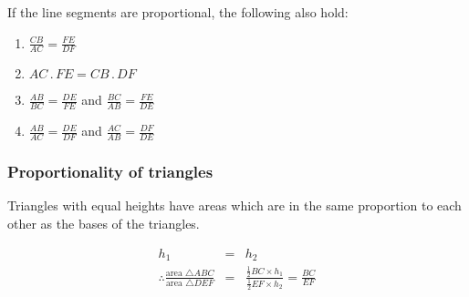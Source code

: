 If the line segments are proportional, the following also hold:
\begin{enumerate}
\item $\frac{CB}{AC} = \frac{FE}{DF}$
\item $AC\,.\, FE = CB\,.\, DF$
\item $\frac{AB}{BC} = \frac{DE}{FE}$ and $\frac{BC}{AB} = \frac{FE}{DE}$
\item $\frac{AB}{AC} = \frac{DE}{DF}$ and $\frac{AC}{AB} = \frac{DF}{DE}$
\end{enumerate}

\subsubsection*{Proportionality of triangles}
Triangles with equal heights have areas which are in the same proportion to each other as the bases of the triangles.

\begin{eqnarray*}
h_1 &=& h_2\\
\therefore \frac{\text{area }\triangle ABC}{\text{area }\triangle DEF} &=& \frac{\frac{1}{2}BC \times h_1}{\frac{1}{2}EF \times h_2} = \frac{BC}{EF}
\end{eqnarray*}

